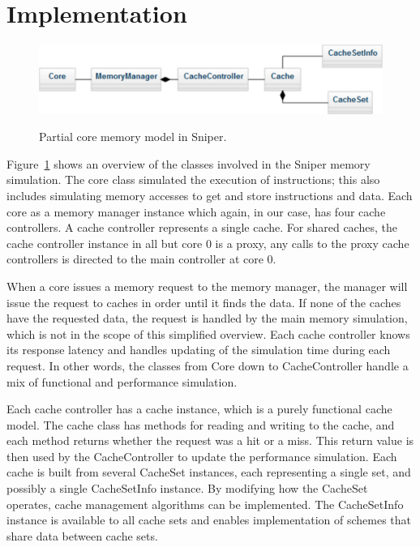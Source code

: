 \section{Implementation}
\label{sec:framework:implementation}

\begin{figure}[ht]
\centering
\includegraphics[scale=0.7]{figures/framework/functional_core_model}
\label{fig:framework:implementation:core_memory}
\caption{Partial core memory model in Sniper.}
\end{figure}

Figure~\ref{fig:framework:implementation:core_memory} shows an overview of the classes involved in the Sniper memory simulation.
The core class simulated the execution of instructions; this also includes simulating memory accesses to get and store instructions and data.
Each core as a memory manager instance which again, in our case, has four cache controllers.
A cache controller represents a single cache.
For shared caches, the cache controller instance in all but core 0 is a proxy, any calls to the proxy cache controllers is directed to the main controller at core 0.

When a core issues a memory request to the memory manager, the manager will issue the request to caches in order until it finds the data. 
If none of the caches have the requested data, the request is handled by the main memory simulation, which is not in the scope of this simplified overview.
Each cache controller knows its response latency and handles updating of the simulation time during each request.
In other words, the classes from Core down to CacheController handle a mix of functional and performance simulation.

Each cache controller has a cache instance, which is a purely functional cache model.
The cache class has methods for reading and writing to the cache, and each method returns whether the request was a hit or a miss.
This return value is then used by the CacheController to update the performance simulation.
Each cache is built from several CacheSet instances, each representing a single set, and possibly a single CacheSetInfo instance.
By modifying how the CacheSet operates, cache management algorithms can be implemented.
The CacheSetInfo instance is available to all cache sets and enables implementation of schemes that share data between cache sets.

